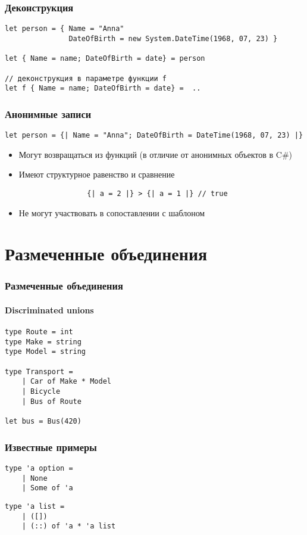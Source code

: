 \documentclass[xetex,mathserif,serif]{beamer}
\begin{document}
    \begin{frame}[fragile]
        \frametitle{Деконструкция}
        \begin{verbatim}
let person = { Name = "Anna"
               DateOfBirth = new System.DateTime(1968, 07, 23) }

let { Name = name; DateOfBirth = date} = person

// деконструкция в параметре функции f
let f { Name = name; DateOfBirth = date} =  ..
        \end{verbatim}
    \end{frame}

    \begin{frame}[fragile]
        \frametitle{Анонимные записи}
        \begin{verbatim}
let person = {| Name = "Anna"; DateOfBirth = DateTime(1968, 07, 23) |}
        \end{verbatim}
        \begin{itemize}
            \item Могут возвращаться из функций (в отличие от анонимных объектов в C\#)
            \item Имеют структурное равенство и сравнение
                \begin{verbatim}
                {| a = 2 |} > {| a = 1 |} // true
                \end{verbatim}
            \item Не могут участвовать в сопоставлении с шаблоном
        \end{itemize}
    \end{frame}

    \section{Размеченные объединения}
    
    \begin{frame}[fragile]
        \frametitle{Размеченные объединения}
        \framesubtitle{Discriminated unions}
        \begin{verbatim}
type Route = int
type Make = string
type Model = string

type Transport =
    | Car of Make * Model
    | Bicycle
    | Bus of Route

let bus = Bus(420)
        \end{verbatim}
    \end{frame}

    \begin{frame}[fragile]
        \frametitle{Известные примеры}
        \begin{verbatim}
type 'a option =
    | None
    | Some of 'a
        \end{verbatim}

        \vspace{5mm}
        \begin{verbatim}
type 'a list =
    | ([])
    | (::) of 'a * 'a list
        \end{verbatim}
    \end{frame}
\end{document}
